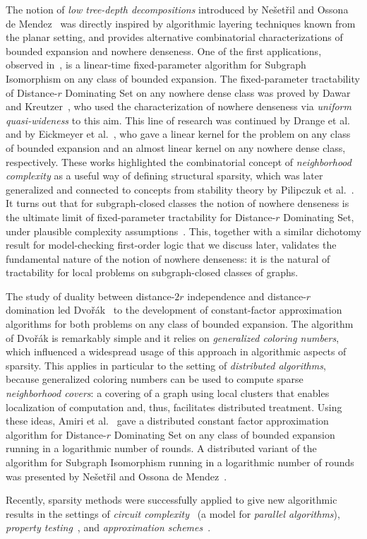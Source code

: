 The notion of {\em{low tree-depth decompositions}} introduced by Ne\v{s}et\v{r}il and Ossona de Mendez~\cite{NesetrilM08a} was directly inspired by algorithmic layering techniques known from the planar setting,
and provides alternative combinatorial characterizations of bounded expansion and nowhere denseness.
One of the first applications, observed in~\cite{NesetrilM08a}, is a linear-time fixed-parameter algorithm for Subgraph Isomorphism on any class of bounded expansion.
The fixed-parameter tractability of Distance-$r$ Dominating Set on any nowhere dense class was proved by Dawar and Kreutzer~\cite{DawarK09}, 
who used the characterization of nowhere denseness via {\em{uniform quasi-wideness}} to this aim.
This line of research was continued by Drange et al.~\cite{DrangeDFKLPPRVS16} and by Eickmeyer et al.~\cite{eickmeyer2016neighborhood}, 
who gave a linear kernel for the problem on any class of bounded expansion and an almost linear kernel on any nowhere dense class, respectively.
These works highlighted the combinatorial concept of {\em{neighborhood complexity}} as a useful way of defining structural sparsity, 
which was later generalized and connected to concepts from stability theory by Pilipczuk et al.~\cite{pilipczuk2018number}.
It turns out that for subgraph-closed classes the notion of nowhere denseness is the ultimate limit of fixed-parameter tractability for Distance-$r$ Dominating Set,
under plausible complexity assumptions~\cite{DrangeDFKLPPRVS16}. This, together with a similar dichotomy result for model-checking first-order logic that we discuss later,
validates the fundamental nature of the notion of nowhere denseness: it is the natural of tractability for local problems on subgraph-closed classes of graphs.

The study of duality between distance-$2r$ independence and distance-$r$ domination led Dvo\v{r}\'ak~\cite{Dvorak13}
to the development of constant-factor approximation algorithms for both problems on any class of bounded expansion.
The algorithm of Dvo\v{r}\'ak is remarkably simple and it relies on {\em{generalized coloring numbers}}, which influenced a widespread usage of this approach in algorithmic aspects of sparsity.
This applies in particular to the setting of {\em{distributed algorithms}}, because generalized coloring numbers can be used to compute sparse {\em{neighborhood covers}}: 
a covering of a graph using local clusters that enables localization of computation and, thus, facilitates distributed treatment.
Using these ideas, Amiri et al.~\cite{AmiriMRS18} gave a distributed constant factor approximation algorithm for Distance-$r$ Dominating Set on any class of bounded expansion running in a logarithmic number of rounds.
A distributed variant of the algorithm for Subgraph Isomorphism running in a logarithmic number of rounds was presented by Ne\v{s}et\v{r}il and Ossona de Mendez~\cite{NesetrilM16}.

Recently, sparsity methods were successfully applied to give new algorithmic results in the settings of {\em{circuit complexity}}~\cite{PilipczukST18} 
(a model for {\em{parallel algorithms}}), {\em{property testing}}~\cite{AdlerH18}, and {\em{approximation schemes}}~\cite{Har-PeledQ17}.


